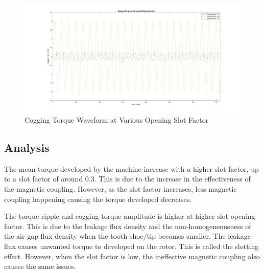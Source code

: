 \documentclass[12pt]{article}
\begin{document}
\begin{figure}[H]
    \centering
    \includegraphics[width=\linewidth]{img/task_10_cogging_torque.png}
    \caption{Cogging Torque Waveform at Various Opening Slot Factor}
    \label{fig:task-10-cogging}
\end{figure}

\subsection{Analysis}

The mean torque developed by the machine increase with a higher slot factor, up to a slot factor of around 0.3. This is due to the increase in the effectiveness of the magnetic coupling. However, as the slot factor increases, less magnetic coupling happening causing the torque developed decreases.

The torque ripple and cogging torque amplitude is higher at higher slot opening factor. This is due to the leakage flux density and the non-homogeneousness of the air gap flux density when the tooth shoe/tip becomes smaller. The leakage flux causes unwanted torque to developed on the rotor. This is called the slotting effect. However, when the slot factor is low, the ineffective magnetic coupling also causes the same issues. \cite{task-10}

\clearpage

\printbibliography
\end{document}

